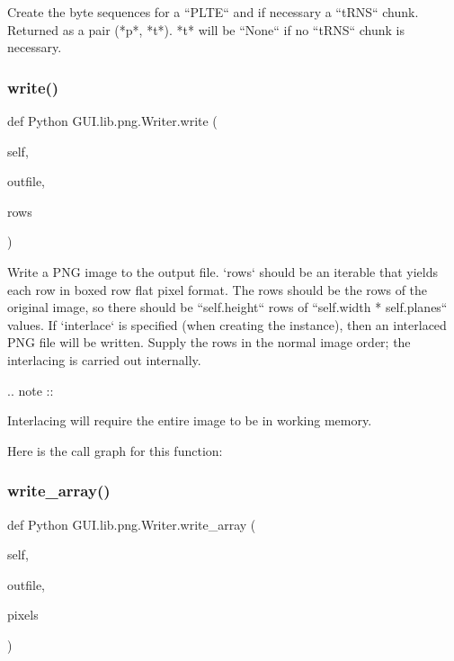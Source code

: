 \begin{DoxyVerb}Create the byte sequences for a ``PLTE`` and if necessary a
``tRNS`` chunk.  Returned as a pair (*p*, *t*).  *t* will be
``None`` if no ``tRNS`` chunk is necessary.
\end{DoxyVerb}
 \mbox{\label{class_python_01_g_u_i_1_1lib_1_1png_1_1_writer_afe46070d1c56d08d18a48774924d1966}} 
\subsubsection{\texorpdfstring{write()}{write()}}
{\footnotesize\ttfamily def Python G\+U\+I.\+lib.\+png.\+Writer.\+write (\begin{DoxyParamCaption}\item[{}]{self,  }\item[{}]{outfile,  }\item[{}]{rows }\end{DoxyParamCaption})}

\begin{DoxyVerb}Write a PNG image to the output file.  `rows` should be
an iterable that yields each row in boxed row flat pixel
format.  The rows should be the rows of the original image,
so there should be ``self.height`` rows of ``self.width *
self.planes`` values.  If `interlace` is specified (when
creating the instance), then an interlaced PNG file will
be written.  Supply the rows in the normal image order;
the interlacing is carried out internally.

.. note ::

  Interlacing will require the entire image to be in working
  memory.
\end{DoxyVerb}
 Here is the call graph for this function\+:
\mbox{\label{class_python_01_g_u_i_1_1lib_1_1png_1_1_writer_a236f3bf09634539c21b4978014adc9b1}} 
\subsubsection{\texorpdfstring{write\+\_\+array()}{write\_array()}}
{\footnotesize\ttfamily def Python G\+U\+I.\+lib.\+png.\+Writer.\+write\+\_\+array (\begin{DoxyParamCaption}\item[{}]{self,  }\item[{}]{outfile,  }\item[{}]{pixels }\end{DoxyParamCaption})}


